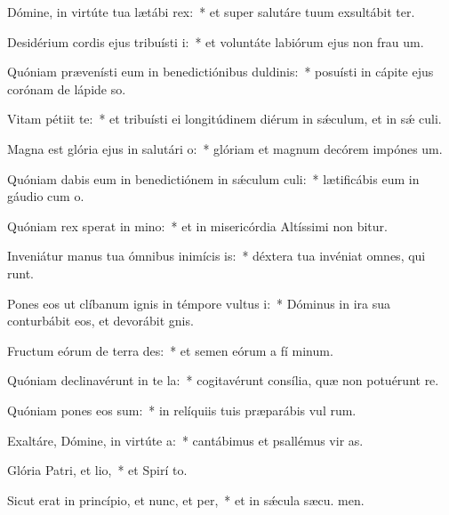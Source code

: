 \item Dómine, in virtúte tua lætábi rex:~* et super salutáre tuum exsultábit ter.
\item Desidérium cordis ejus tribuísti i:~* et voluntáte labiórum ejus non frau um.
\item Quóniam prævenísti eum in benedictiónibus duldinis:~* posuísti in cápite ejus corónam de lápide so.
\item Vitam pétiit  te:~* et tribuísti ei longitúdinem diérum in sǽculum, et in sǽ culi.
\item Magna est glória ejus in salutári o:~* glóriam et magnum decórem impónes  um.
\item Quóniam dabis eum in benedictiónem in sǽculum culi:~* lætificábis eum in gáudio cum  o.
\item Quóniam rex sperat in mino:~* et in misericórdia Altíssimi non bitur.
\item Inveniátur manus tua ómnibus inimícis is:~* déxtera tua invéniat omnes, qui  runt.
\item Pones eos ut clíbanum ignis in témpore vultus i:~* Dóminus in ira sua conturbábit eos, et devorábit  gnis.
\item Fructum eórum de terra des:~* et semen eórum a fí minum.
\item Quóniam declinavérunt in te la:~* cogitavérunt consília, quæ non potuérunt re.
\item Quóniam pones eos sum:~* in relíquiis tuis præparábis vul rum.
\item Exaltáre, Dómine, in virtúte a:~* cantábimus et psallémus vir as.
\item Glória Patri, et lio,~* et Spirí to.
\item Sicut erat in princípio, et nunc, et per,~* et in sǽcula sæcu. men.
